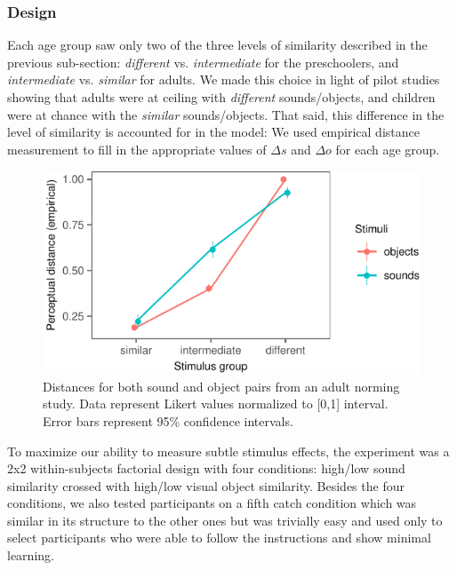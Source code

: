 \documentclass[english,,man,floatsintext]{apa6}
\theoremstyle{definition}
\theoremstyle{definition}
\theoremstyle{definition}
\theoremstyle{remark}
\begin{document}
\subsubsection{Design}\label{design}

Each age group saw only two of the three levels of similarity described
in the previous sub-section: \emph{different} vs. \emph{intermediate}
for the preschoolers, and \emph{intermediate} vs. \emph{similar} for
adults. We made this choice in light of pilot studies showing that
adults were at ceiling with \emph{different} sounds/objects, and
children were at chance with the \emph{similar} sounds/objects. That
said, this difference in the level of similarity is accounted for in the
model: We used empirical distance measurement to fill in the appropriate
values of \(\Delta s\) and \(\Delta o\) for each age group.

\begin{figure}[h]

{\centering \includegraphics{ms_files/figure-latex/stim-1} 

}

\caption{Distances for both sound and object pairs from an adult norming study. Data represent Likert values normalized to [0,1] interval. Error bars represent 95\% confidence intervals.}\label{fig:stim}
\end{figure}

To maximize our ability to measure subtle stimulus effects, the
experiment was a 2x2 within-subjects factorial design with four
conditions: high/low sound similarity crossed with high/low visual
object similarity. Besides the four conditions, we also tested
participants on a fifth catch condition which was similar in its
structure to the other ones but was trivially easy and used only to
select participants who were able to follow the instructions and show
minimal learning.
\end{document}
